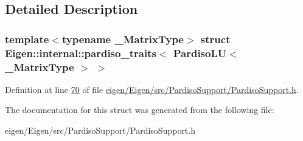 \subsection{Detailed Description}
\subsubsection*{template$<$typename \+\_\+\+Matrix\+Type$>$\newline
struct Eigen\+::internal\+::pardiso\+\_\+traits$<$ Pardiso\+L\+U$<$ \+\_\+\+Matrix\+Type $>$ $>$}



Definition at line \hyperlink{eigen_2_eigen_2src_2_pardiso_support_2_pardiso_support_8h_source_l00070}{70} of file \hyperlink{eigen_2_eigen_2src_2_pardiso_support_2_pardiso_support_8h_source}{eigen/\+Eigen/src/\+Pardiso\+Support/\+Pardiso\+Support.\+h}.



The documentation for this struct was generated from the following file\+:\begin{DoxyCompactItemize}
\item 
eigen/\+Eigen/src/\+Pardiso\+Support/\+Pardiso\+Support.\+h\end{DoxyCompactItemize}
